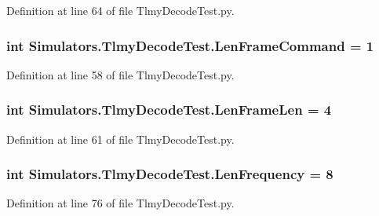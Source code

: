 Definition at line 64 of file Tlmy\+Decode\+Test.\+py.

\hypertarget{namespace_simulators_1_1_tlmy_decode_test_a77da7f775045ecca5d656005d554f152}{}
\subsubsection[{Len\+Frame\+Command}]{\setlength{\rightskip}{0pt plus 5cm}int Simulators.\+Tlmy\+Decode\+Test.\+Len\+Frame\+Command = 1}\label{namespace_simulators_1_1_tlmy_decode_test_a77da7f775045ecca5d656005d554f152}


Definition at line 58 of file Tlmy\+Decode\+Test.\+py.

\hypertarget{namespace_simulators_1_1_tlmy_decode_test_aa6ecc7c034ba7d263536e7029bc3a102}{}
\subsubsection[{Len\+Frame\+Len}]{\setlength{\rightskip}{0pt plus 5cm}int Simulators.\+Tlmy\+Decode\+Test.\+Len\+Frame\+Len = 4}\label{namespace_simulators_1_1_tlmy_decode_test_aa6ecc7c034ba7d263536e7029bc3a102}


Definition at line 61 of file Tlmy\+Decode\+Test.\+py.

\hypertarget{namespace_simulators_1_1_tlmy_decode_test_aa67266bdf51470854eb84aa684fe8333}{}
\subsubsection[{Len\+Frequency}]{\setlength{\rightskip}{0pt plus 5cm}int Simulators.\+Tlmy\+Decode\+Test.\+Len\+Frequency = 8}\label{namespace_simulators_1_1_tlmy_decode_test_aa67266bdf51470854eb84aa684fe8333}


Definition at line 76 of file Tlmy\+Decode\+Test.\+py.

